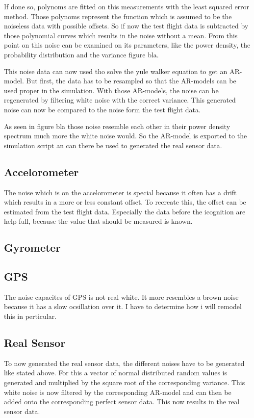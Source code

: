 If done so, polynoms are fitted on this measurements with the least squared error method.
Those polynoms represent the function which is assumed to be the noiseless data with possible offsets.
So if now the test flight data is subtracted by those polynomial curves which results in the noise without a mean.
From this point on this noise can be examined on its parameters, like the power density, the probability distribution and the variance figure bla.


This noise data can now used tho solve the yule walker equation to get an AR-model.
But first, the data has to be resampled so that the AR-models can be used proper in the simulation.
With those AR-models, the noise can be regenerated by filtering white noise with the correct variance.
This generated noise can now be compared to the noise form the test flight data.


As seen in figure bla those noise resemble each other in their power density spectrum much more the white noise would.
So the AR-model is exported to the simulation script an can there be used to generated the real sensor data.

\subsection{Accelorometer}
The noise which is on the accelorometer is special because it often has a drift which results in a more or less constant offset.
To recreate this, the offset can be estimated from the test flight data.
Especially the data before the icognition are help full, because the value that should be measured is known.

\subsection{Gyrometer}


\subsection{GPS}
The noise capacites of GPS is not real white. It more resembles a brown noise because it has a slow ocsillation over it.
I have to determine how i will remodel this in perticular.

\subsection{Real Sensor}
To now generated the real sensor data, the different noises have to be generated like stated above.
For this a vector of normal distributed random values is generated and multiplied by the square root of the corresponding variance.
This white noise is now filtered by the corresponding AR-model and can then be added onto the corresponding perfect sensor data.
This now results in the real sensor data.

